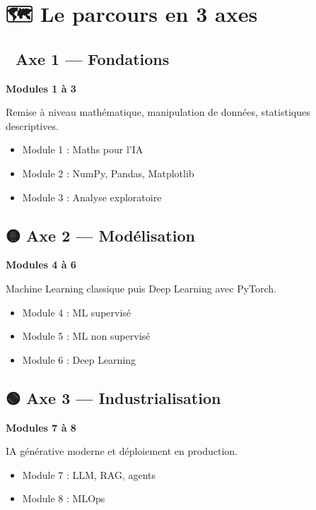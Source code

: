 \documentclass[
  french,
  11pt,
  a4paper,
]{scrbook}
\providecommand{\tightlist}{%
  \setlength{\itemsep}{0pt}\setlength{\parskip}{0pt}}
\begin{document}
\section{🗺️ Le parcours en 3 axes}\label{le-parcours-en-3-axes}

\subsection{🔵 Axe 1 --- Fondations}\label{axe-1-fondations}

\textbf{Modules 1 à 3}

Remise à niveau mathématique, manipulation de données, statistiques
descriptives.

\begin{itemize}
\tightlist
\item
  Module 1 : Maths pour l'IA
\item
  Module 2 : NumPy, Pandas, Matplotlib
\item
  Module 3 : Analyse exploratoire
\end{itemize}

\subsection{🟡 Axe 2 --- Modélisation}\label{axe-2-moduxe9lisation}

\textbf{Modules 4 à 6}

Machine Learning classique puis Deep Learning avec PyTorch.

\begin{itemize}
\tightlist
\item
  Module 4 : ML supervisé
\item
  Module 5 : ML non supervisé
\item
  Module 6 : Deep Learning
\end{itemize}

\subsection{🟢 Axe 3 ---
Industrialisation}\label{axe-3-industrialisation}

\textbf{Modules 7 à 8}

IA générative moderne et déploiement en production.

\begin{itemize}
\tightlist
\item
  Module 7 : LLM, RAG, agents
\item
  Module 8 : MLOps
\end{itemize}
\end{document}
